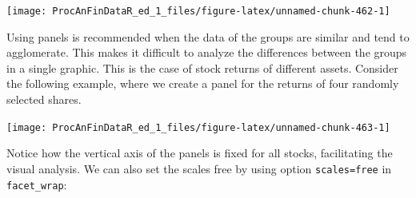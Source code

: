 \documentclass[11pt,]{book}
\newenvironment{Shaded}{\begin{snugshade}}{\end{snugshade}}
\newcommand{\KeywordTok}[1]{\textcolor[rgb]{0.27,0.27,0.27}{\textbf{#1}}}
\newcommand{\DataTypeTok}[1]{\textcolor[rgb]{0.27,0.27,0.27}{#1}}
\newcommand{\DecValTok}[1]{\textcolor[rgb]{0.06,0.06,0.06}{#1}}
\newcommand{\StringTok}[1]{\textcolor[rgb]{0.5,0.5,0.5}{#1}}
\newcommand{\CommentTok}[1]{\textcolor[rgb]{0.56,0.35,0.01}{\textit{#1}}}
\newcommand{\OperatorTok}[1]{\textcolor[rgb]{0.81,0.36,0.00}{\textbf{#1}}}
\newcommand{\NormalTok}[1]{#1}
\begin{document}
\begin{center}\texttt{[image: ProcAnFinDataR\_ed\_1\_files/figure-latex/unnamed-chunk-462-1]} \end{center}

Using panels is recommended when the data of the groups are similar and
tend to agglomerate. This makes it difficult to analyze the differences
between the groups in a single graphic. This is the case of stock
returns of different assets. Consider the following example, where we
create a panel for the returns of four randomly selected shares.

\begin{Shaded}
\end{Shaded}

\begin{center}\texttt{[image: ProcAnFinDataR\_ed\_1\_files/figure-latex/unnamed-chunk-463-1]} \end{center}

Notice how the vertical axis of the panels is fixed for all stocks,
facilitating the visual analysis. We can also set the scales free by
using option \texttt{scales=\textquotesingle{}free\textquotesingle{}} in
\texttt{facet\_wrap}:
\end{document}
